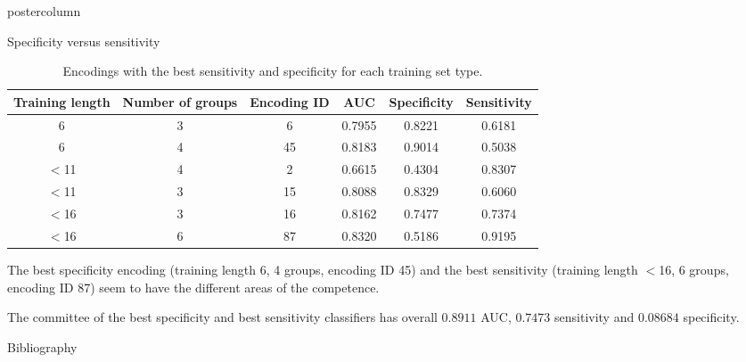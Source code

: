 \documentclass[final]{beamer}\usepackage[]{graphicx}\usepackage[]{color}
\newlength{\columnheight}
\begin{document}
\begin{frame}
\begin{columns}
\begin{column}{.50\textwidth}
\begin{beamercolorbox}[center,wd=\textwidth]{postercolumn}
\begin{minipage}[T]{.95\textwidth}  
\parbox[t][\columnheight]{\textwidth}
{




\begin{block}{Specificity versus sensitivity}
\begin{table}[ht]
\centering
\begin{tabular}{c|c|c|c|c|c}
  \toprule
Training length & Number of groups & Encoding ID & AUC & Specificity & Sensitivity \\ 
  \midrule
6 & 3 & 6 & 0.7955 & 0.8221 & 0.6181 \\ 
   \rowcolor[gray]{0.75}6 & 4 & 45 & 0.8183 & 0.9014 & 0.5038 \\ 
  $<$11 & 4 & 2 & 0.6615 & 0.4304 & 0.8307 \\ 
   \rowcolor[gray]{0.75}$<$11 & 3 & 15 & 0.8088 & 0.8329 & 0.6060 \\ 
  $<$16 & 3 & 16 & 0.8162 & 0.7477 & 0.7374 \\ 
   \rowcolor[gray]{0.75}$<$16 & 6 & 87 & 0.8320 & 0.5186 & 0.9195 \\ 
   \bottomrule
\end{tabular}
\caption{Encodings with the best sensitivity and specificity for each training set type.} 
\end{table}


The best specificity encoding (training length 6, 4 groups, encoding ID 45) and the best sensitivity (training length $<$16, 6 groups, encoding ID 87) seem to have the different areas of the competence.

The committee of the best specificity and best sensitivity classifiers has overall $0.8911$ AUC, $0.7473$ sensitivity and $0.08684$ specificity.



\end{block}
\vfill

\begin{block}{Bibliography}
  \tiny{
  
  
  }
  \end{block}
  \vfill

}
\end{minipage}
\end{beamercolorbox}
\end{column}
\end{columns}  
\end{frame}
\end{document}
